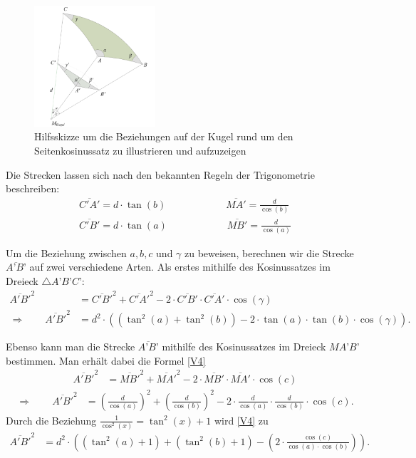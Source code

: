 \begin{refsection}
\begin{figure}[htbp]
\centering
\includegraphics[width=0.4\textwidth]{kugel/Seitenkosinus.jpg}
\caption{Hilfsskizze um die Beziehungen auf der Kugel rund um den Seitenkosinussatz zu illustrieren und aufzuzeigen}
\end{figure}

Die Strecken lassen sich nach den bekannten Regeln der Trigonometrie beschreiben:
\begin{align*}
\overline{C'A'} = d\cdot {\tan(b)} \quad \quad \quad \quad \quad \quad 
\overline{MA'} = \frac{ d }{\cos(b)} \\
\overline{C'B'} = d\cdot {\tan(a)} \quad \quad \quad \quad \quad \quad 
\overline{MB'} = \frac{ d }{\cos(a)}
\end{align*} 

Um die Beziehung zwischen $a,b,c$ und $\gamma$ zu beweisen, berechnen wir die Strecke $\overline{A’B’}$ auf zwei verschiedene Arten.
Als erstes mithilfe des Kosinussatzes im Dreieck $\triangle{A’B’C’}$:
\begin{align}
\overline{A'B'}^{ 2 } &= \overline{ C'B' }^{ 2 } + \overline{ C'A' }^{ 2 } - 2 \cdot \overline{C'B'} \cdot \overline{ C'A' } \cdot \cos(\gamma) \nonumber \\ 
\Rightarrow \quad \quad
\overline{A'B'}^{ 2 } &= d^{ 2 } \cdot \left(\left(\tan^{ 2 }(a) + \tan^{ 2 }(b)\right) - 2\cdot \tan(a) \cdot \tan(b) \cdot \cos(\gamma)\right).
\label {V3} 
\end{align}

Ebenso kann man die Strecke $\overline{A’B’}$ mithilfe des Kosinussatzes im Dreieck $MA’B’$ bestimmen. Man erhält dabei die Formel \eqref{V4}
\begin{align*}
\overline{A'B'}^{2} &= \overline{MB'}^{2} + \overline{MA'}^{2} - 2\cdot \overline{MB'} \cdot \overline{MA'} \cdot \cos(c)
\end{align*}
\begin{align}
\Rightarrow \quad \quad
\overline{A'B'}^{ 2 } &= \left(\frac{ d }{\cos(a) }  \right)^{ 2 } + \left(\frac{ d }{\cos(b)}  \right)^{ 2 } - 2 \cdot \frac{ d }{\cos(a)} \cdot \frac{ d }{\cos(b)} \cdot \cos(c).
\label{V4}
\end{align}
Durch die Beziehung $\frac{1}{\cos^{2}(x)}=\tan^{2}(x)+1$ wird \eqref{V4} zu 
\begin{align}
\overline{ A'B'}^{ 2 } &= d^{ 2 } \cdot \left(\left(\tan^{ 2 }(a) + 1\right) + \left(\tan^{ 2 }(b) + 1\right) - \left(2 \cdot \frac{\cos(c)}{\cos(a) \cdot \cos(b)}\right)\right).
\label {V6}
\end{align}


\end{refsection}
